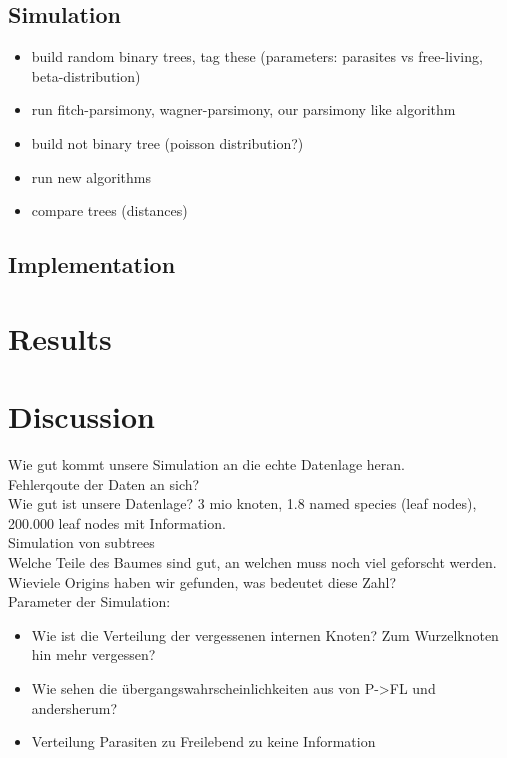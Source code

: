   \section{Simulation}
    \begin{itemize}
      \item build random binary trees, tag these (parameters: parasites vs free-living, beta-distribution)
      \item run fitch-parsimony, wagner-parsimony, our parsimony like algorithm
      \item build not binary tree (poisson distribution?)
      \item run new algorithms
      \item compare trees (distances)
    \end{itemize}
  \section{Implementation}
\chapter{Results}
\chapter{Discussion}

  Wie gut kommt unsere Simulation an die echte Datenlage heran. \\
  Fehlerqoute der Daten an sich? \\
  Wie gut ist unsere Datenlage? 3 mio knoten, 1.8 named species (leaf nodes), 200.000 leaf nodes mit Information. \\
  Simulation von subtrees \\
  Welche Teile des Baumes sind gut, an welchen muss noch viel geforscht werden. \\
  Wieviele Origins haben wir gefunden, was bedeutet diese Zahl? \\
  
  Parameter der Simulation:
  \begin{itemize}
    \item Wie ist die Verteilung der vergessenen internen Knoten? Zum Wurzelknoten hin mehr vergessen?
    \item Wie sehen die übergangswahrscheinlichkeiten aus von P->FL und andersherum?
    \item Verteilung Parasiten zu Freilebend zu keine Information
  \end{itemize}
  






